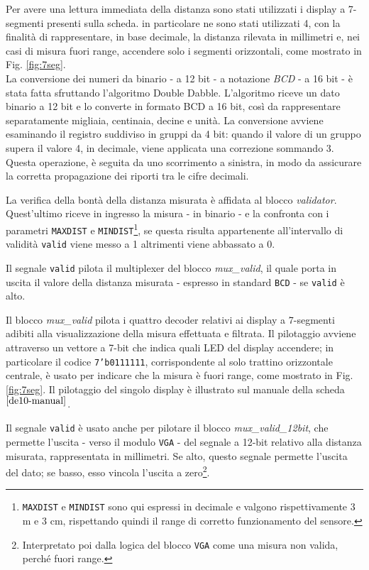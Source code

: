 \documentclass[reprint,amsmath,amssymb,aps,rmp,twoside]{revtex4-2}
\begin{document}
Per avere una lettura immediata della distanza sono stati utilizzati i display a 7-segmenti presenti sulla scheda. in particolare ne sono stati utilizzati 4, con la finalità di rappresentare, in base decimale, la distanza rilevata in millimetri e, nei casi di misura fuori range, accendere solo i segmenti orizzontali, come mostrato in Fig. \ref{fig:7seg}.\\
La conversione dei numeri da binario - a 12 bit - a notazione \textit{BCD} - a 16 bit - è stata fatta sfruttando l'algoritmo Double Dabble. L’algoritmo riceve un dato binario a 12 bit e lo converte in formato BCD a 16 bit, così da rappresentare separatamente migliaia, centinaia, decine e unità. La conversione avviene esaminando il registro suddiviso in gruppi da 4 bit: quando il valore di un gruppo supera il valore 4, in decimale, viene applicata una correzione sommando 3. Questa operazione, è seguita da uno scorrimento a sinistra, in modo da assicurare la corretta propagazione dei riporti tra le cifre decimali.

\vspace{0.3cm}

La verifica della bontà della distanza misurata è affidata al blocco \textit{validator}. Quest'ultimo riceve in ingresso la misura - in binario - e la confronta con i parametri \texttt{MAXDIST} e \texttt{MINDIST}\footnote{\texttt{MAXDIST} e \texttt{MINDIST} sono qui espressi in decimale e valgono rispettivamente 3 m e 3 cm, rispettando quindi il range di corretto funzionamento del sensore.}, se questa risulta appartenente all'intervallo di validità \texttt{valid} viene messo a 1 altrimenti viene abbassato a 0. 

Il segnale \texttt{valid} pilota il multiplexer del blocco \textit{mux\_valid}, il quale porta in uscita il valore della distanza misurata - espresso in standard \texttt{BCD} - se \texttt{valid} è alto.

Il blocco \textit{mux\_valid} pilota i quattro decoder relativi ai display a 7-segmenti adibiti alla visualizzazione della misura effettuata e filtrata. Il pilotaggio avviene attraverso un vettore a 7-bit che indica quali LED del display accendere; in particolare il codice \texttt{7'b0111111}, corrispondente al solo trattino orizzontale centrale, è usato per indicare che la misura è fuori range, come mostrato in Fig. \ref{fig:7seg}. Il pilotaggio del singolo display è illustrato sul manuale della scheda$^{\cite{de10-manual}}$.

Il segnale \texttt{valid} è usato anche per pilotare il blocco \textit{mux\_valid\_12bit}, che permette l'uscita - verso il modulo \texttt{VGA} - del segnale a 12-bit relativo alla distanza misurata, rappresentata in millimetri. Se alto, questo segnale permette l'uscita del dato; se basso, esso vincola l'uscita a zero\footnote{Interpretato poi dalla logica del blocco \texttt{VGA} come una misura non valida, perché fuori range.}.
\end{document}
